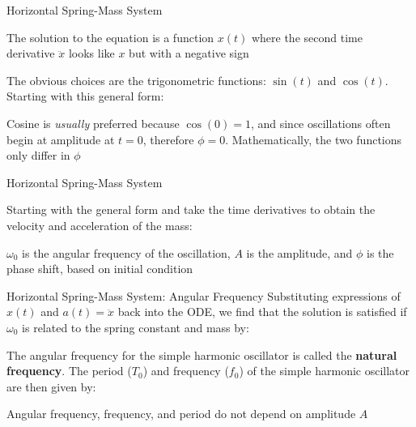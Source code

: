 \documentclass[12pt,compress,aspectratio=169]{beamer}
\begin{document}
\begin{frame}{Horizontal Spring-Mass System}

  The solution to the equation is a function $x(t)$ where the second time
  derivative $\ddot x$ looks like $x$ but with a negative sign


  The obvious choices are the trigonometric functions: $\sin(t)$ and $\cos(t)$.
  Starting with this general form:
    
  
  Cosine is \emph{usually} preferred because $\cos(0)=1$, and since
  oscillations often begin at amplitude at $t=0$, therefore $\phi=0$.
  Mathematically, the two functions only differ in $\phi$
\end{frame}



\begin{frame}{Horizontal Spring-Mass System}

  
  Starting with the general form and take the time derivatives to obtain the
  velocity and acceleration of the mass:
 
  \vspace{-.2in}{\large
    \begin{align*}
      x(t)&=A\cos(\omega_0 t-\phi)\\
      v(t)&=-A\omega_0\sin(\omega_0 t-\phi)\\
      a(t)&=-A\omega_0^2\cos(\omega_0 t-\phi)=-\omega_0^2x
    \end{align*}
  }
  
  $\omega_0$ is the angular frequency of the oscillation, $A$ is the amplitude,
  and $\phi$ is the phase shift, based on initial condition
\end{frame}



\begin{frame}{Horizontal Spring-Mass System: Angular Frequency}
  Substituting expressions of $x(t)$ and $a(t)=\ddot x$ back into the ODE, we
  find that the solution is satisfied if $\omega_0$ is related to the spring
  constant and mass by:


  The angular frequency for the simple harmonic oscillator is called the
  \textbf{natural frequency}. The period ($T_0$) and frequency ($f_0$) of the
  simple harmonic oscillator are then given by:

  
  Angular frequency, frequency, and period do not depend on amplitude $A$
\end{frame}
\end{document}
